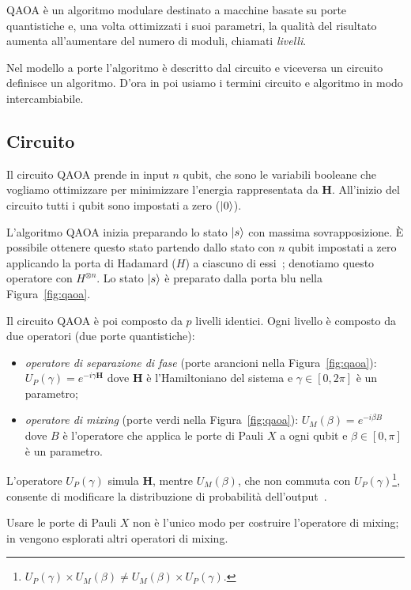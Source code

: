QAOA è un algoritmo modulare destinato a macchine basate su porte quantistiche e, una volta ottimizzati i suoi parametri, la qualità del risultato aumenta all'aumentare del numero di moduli, chiamati \emph{livelli}.

Nel modello a porte l'algoritmo è descritto dal circuito e viceversa un circuito definisce un algoritmo. D'ora in poi usiamo i termini circuito e algoritmo in modo intercambiabile.

\subsection{Circuito}
\label{sec:qaoa_circ}
Il circuito QAOA prende in input $n$ qubit, che sono le variabili booleane che vogliamo ottimizzare per minimizzare l'energia rappresentata da $\mathbf{H}$. All'inizio del circuito tutti i qubit sono impostati a zero ($\Ket{0}$).

L'algoritmo QAOA inizia preparando lo stato $\Ket{s}$ con massima sovrapposizione. È possibile ottenere questo stato partendo dallo stato con $n$ qubit impostati a zero applicando la porta di Hadamard ($H$) a ciascuno di essi~\cite{fakhimi2023quantum}; denotiamo questo operatore con $H^{\otimes n}$. Lo stato $\Ket{s}$ è preparato dalla porta blu nella Figura~\ref{fig:qaoa}.

Il circuito QAOA è poi composto da $p$ livelli identici. Ogni livello è composto da due operatori (due porte quantistiche): 
\begin{itemize}
	\item \emph{operatore di separazione di fase} (porte arancioni nella Figura~\ref{fig:qaoa}): $U_P(\gamma) = e ^{-i\gamma\mathbf{H}}$ dove $\mathbf{H}$ è l'Hamiltoniano del sistema e $\gamma \in [0, 2\pi]$ è un parametro;
	\item \emph{operatore di mixing} (porte verdi nella Figura~\ref{fig:qaoa}): $U_M(\beta) = e ^{-i\beta B}$ dove $B$ è l'operatore che applica le porte di Pauli $X$ a ogni qubit e $\beta \in [0, \pi]$ è un parametro.
\end{itemize}
L'operatore $U_P(\gamma)$ simula $\mathbf{H}$, mentre $U_M(\beta)$, che non commuta con $U_P(\gamma)$\footnote{$U_P(\gamma) \times U_M(\beta) \neq U_M(\beta) \times U_P(\gamma)$.}, consente di modificare la distribuzione di probabilità dell'output~\cite{fakhimi2023quantum}. 

Usare le porte di Pauli $X$ non è l'unico modo per costruire l'operatore di mixing; in \cite{wang2020xy, hadfield2019quantum} vengono esplorati altri operatori di mixing.

